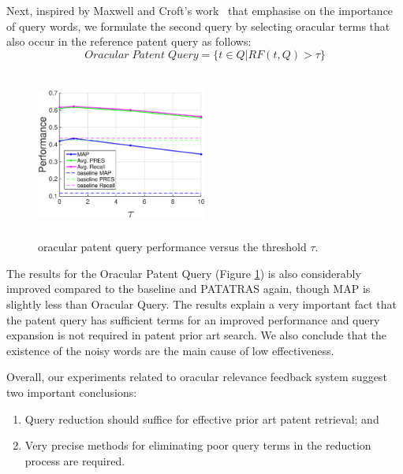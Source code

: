 Next, inspired by Maxwell and Croft's work~\citep{maxwell2013compact} that emphasise on the importance of query words, we formulate the second query by selecting oracular terms that also occur in the reference patent query as follows:
\begin{equation}
 Oracular \; Patent \; Query = \{t\in Q|RF(t, Q)>\tau\}   
 \label{eq:score}
\end{equation}
\begin{figure}[t!]
   \centering
   \includegraphics[width=0.50\textwidth,height=55mm]{figs/oracularpq.eps}
   \caption{oracular patent query performance versus the threshold $\tau$.}   
   \label{fig:oracularpq} 
\end{figure}
The results for the Oracular Patent Query (Figure \ref{fig:oracularpq}) is also considerably improved compared to the baseline and PATATRAS again, though MAP is slightly less than Oracular Query. The results explain a very important fact that the patent query has sufficient terms for an improved performance and query expansion is not required in patent prior art search. We also conclude that the existence of the noisy words are the main cause of low effectiveness.  

Overall, our experiments related to oracular relevance feedback system
suggest two important conclusions: 
\begin{enumerate}
\item Query reduction should suffice for effective prior art patent retrieval; and 
\item Very precise methods for eliminating poor query terms in the reduction process are required.
\end{enumerate}

%

